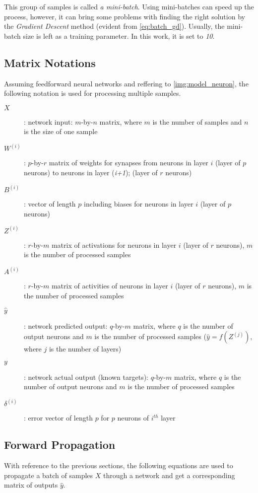 This group of samples is called \textit{a mini-batch}. Using mini-batches can speed up the process, however, it can bring some problems with finding the right solution by the \textit{Gradient Descent} method (evident from \cref{eq:batch_gd}). Usually, the mini-batch size is left as a training parameter. In this work, it is set to \textit{10}.

\subsection{Matrix Notations} \label{ssec:matrix_notation}
Assuming feedforward neural networks and reffering to \cref{img:model_neuron}, the following notation is used for processing multiple samples.

\begin{description}
\item[$ X $] : network input: $ m $-by-$ n $ matrix, where $ m $ is the number of samples and $ n $ is the size of one sample
\item[$ W^{(i)} $] : $ p $-by-$ r $ matrix of weights for synapses from neurons in layer $ i $ (layer of $ p $ neurons) to neurons in layer (\textit{i+1}); (layer of $ r $ neurons)
\item[$ B^{(i)} $] : vector of length $ p $ including biases for neurons in layer $ i $ (layer of $ p $ neurons)
\item[$ Z^{(i)} $] : $ r $-by-$ m $ matrix of activations for neurons in layer $ i $ (layer of $ r $ neurons), $ m $ is the number of processed samples
\item[$ A^{(i)} $] : $ r $-by-$ m $ matrix of activities of neurons in layer $ i $ (layer of $ r $ neurons), $ m $ is the number of processed samples
\item[$ \hat{y} $] : network predicted output: $ q $-by-$ m $ matrix, where $ q $ is the number of output neurons and $ m $ is the number of processed samples ($ \hat{y} = f(Z^{(j)}) $, where $ j $ is the number of layers)
\item[$ y $] : network actual output (known targets): $ q $-by-$ m $ matrix, where $ q $ is the number of output neurons and $ m $ is the number of processed samples
\item[$ \delta^{(i)} $] : error vector of length $ p $ for $ p $ neurons of $ i^{th} $ layer
\end{description}

\subsection{Forward Propagation} \label{ssec:forward_propagation}
With reference to the previous sections, the following equations are used to propagate a batch of samples $ X $ through a network and get a corresponding matrix of outputs $ \hat{y} $.

